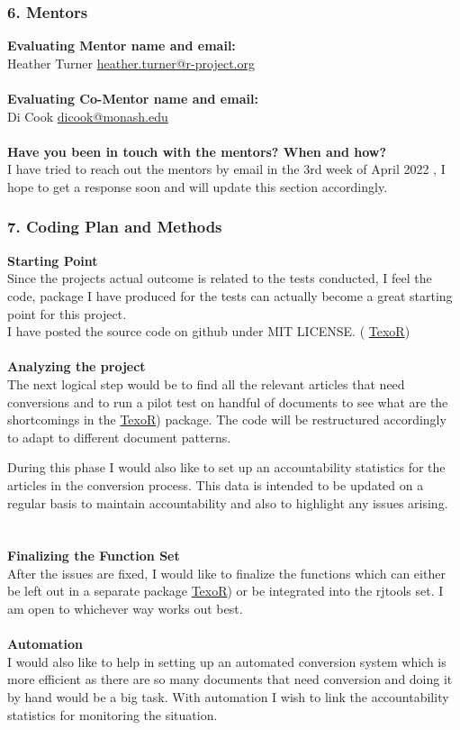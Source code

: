 \documentclass[12pt]{article}
\begin{document}
\subsubsection{6. Mentors}
{\large\bfseries Evaluating Mentor name and email:}\\ Heather Turner {\color{orange}\url{heather.turner@r-project.org}}\\
\\
{\large\bfseries Evaluating Co-Mentor name and email:}\\   Di Cook {\color{orange}\url{dicook@monash.edu}}\\
\\
{\large\bfseries Have you been in touch with the mentors? When and how?}\\
I have tried to reach out the mentors by email in the 3rd week of April 2022 , I hope to get a response soon and will update this section accordingly.

\subsubsection{7. Coding Plan and Methods}
{\large\bfseries Starting Point}\\
 Since the projects actual outcome is related to the tests conducted, I feel the code, package I have produced for the tests can actually become a great starting point for this project.\\
 I have posted the source code on github under MIT LICENSE. ( \href{https://github.com/Abhi-1U/TexoR}{\color{orange}TexoR})\\
 \\
{\large\bfseries Analyzing the project}\\ 
 The next logical step would be to find all the relevant articles that need conversions and to run a pilot test on handful of documents to see what are the shortcomings in the \href{https://github.com/Abhi-1U/TexoR}{\color{orange}TexoR}) package. The code will be restructured accordingly to adapt to different document patterns.
 
 During this phase I would also like to set up an accountability statistics for the articles in the conversion process. This data is intended to be updated on a regular basis to maintain accountability and also to highlight any issues arising.\\
 \\
 \\
 {\large\bfseries Finalizing the Function Set}\\ 
 After the issues are fixed, I would like to finalize the functions which can either be left out in a separate package \href{https://github.com/Abhi-1U/TexoR}{\color{orange}TexoR}) or be integrated into the rjtools set. I am open to whichever way works out best.\\
 \\
 {\large\bfseries Automation}\\
 I would also like to help in setting up an automated conversion system which is more efficient as there are so many documents that need conversion and doing it by hand would be a big task. With automation I wish to link the accountability statistics for monitoring the situation.
 
\end{document}
